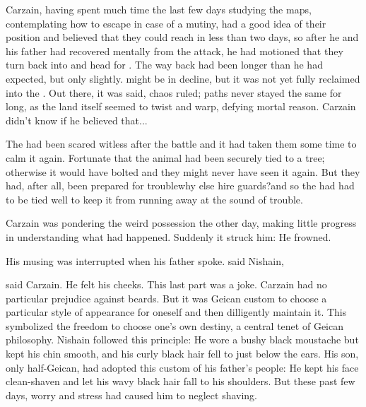 Carzain, having spent much time the last few days studying the maps, contemplating how to escape in case of a mutiny, had a good idea of their position and believed that they could reach \Bryndwin{} in less than two days, so after he and his father had recovered mentally from the attack, he had motioned that they turn back into \Scyrum{} and head for \Bryndwin{}. The way back had been longer than he had expected, but only slightly. 
 might be in decline, but it was not yet fully reclaimed into the \Wylde{}. Out there, it was said, chaos ruled; paths never stayed the same for long, as the land itself seemed to twist and warp, defying mortal reason. Carzain didn't know if he believed that... 


The  had been scared witless after the battle and it had taken them some time to calm it again. 
Fortunate that the animal had been securely tied to a tree; 
otherwise it would have bolted and they might never have seen it again. 
But they had, after all, been prepared for trouble\dash{}why else hire guards?\dash{}and so the \belwan{} had had to be tied well to keep it from running away at the sound of trouble. 

Carzain was pondering the weird possession the other day, making little progress in understanding what had happened. Suddenly it struck him: 
He frowned. 

His musing was interrupted when his father spoke. 
 said Nishain, 

 said Carzain. He felt his cheeks. 
This last part was a joke. Carzain had no particular prejudice against beards. But it was Geican custom to choose a particular style of appearance for oneself and then dilligently maintain it. This symbolized the freedom to choose one's own destiny, a central tenet of Geican philosophy. Nishain followed this principle: He wore a bushy black moustache but kept his chin smooth, and his curly black hair fell to just below the ears. His son, only half-Geican, had adopted this custom of his father's people: He kept his face clean-shaven and let his wavy black hair fall to his shoulders. But these past few days, worry and stress had caused him to neglect shaving. 

